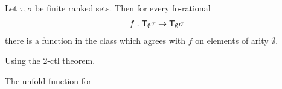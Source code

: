 \begin{lemma}
    Let $\tau,\sigma$ be finite ranked sets. Then for every fo-rational
    \begin{align*}
        f : \mathsf T_\emptyset \tau \to \mathsf T_\emptyset \sigma
    \end{align*}
    there is a function in the class which agrees with $f$ on elements of arity $\emptyset$. 
\end{lemma}
\begin{pr}
    Using the 2-ctl theorem.
    \end{pr}


\begin{lemma}
    The unfold function for 
\end{lemma}
